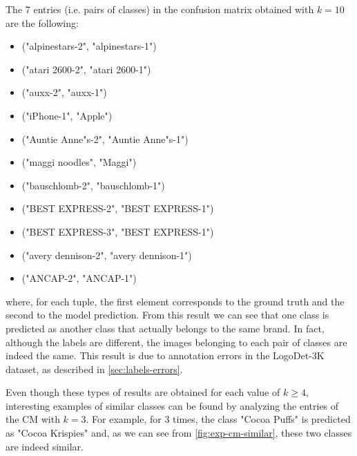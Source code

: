 The 7 entries (i.e. pairs of classes) in the confusion matrix obtained with $k=10$ are the following:
\begin{itemize}
    \item ("alpinestars-2", "alpinestars-1")
    \item ("atari 2600-2", "atari 2600-1")
    \item ("auxx-2", "auxx-1")
    \item ("iPhone-1", "Apple")
    \item ("Auntie Anne"s-2", "Auntie Anne"s-1")
    \item ("maggi noodles", "Maggi")
    \item ("bauschlomb-2", "bauschlomb-1")
    \item ("BEST EXPRESS-2", "BEST EXPRESS-1")
    \item ("BEST EXPRESS-3", "BEST EXPRESS-1")
    \item ("avery dennison-2", "avery dennison-1")
    \item ("ANCAP-2", "ANCAP-1")
\end{itemize}
where, for each tuple, the first element corresponds to the ground truth and the second to the model prediction.
From this result we can see that one class is predicted as another class that actually belongs to the same brand.
In fact, although the labels are different, the images belonging to each pair of classes are indeed the same.
This result is due to annotation errors in the LogoDet-3K dataset, as described in \autoref{sec:labels-errors}.

Even though these types of results are obtained for each value of $k \geq 4$, interesting examples of similar classes can be found by analyzing the entries of the CM with $k = 3$.
For example, for $3$ times, the class "Cocoa Puffs" is predicted as "Cocoa Krispies" and, as we can see from \autoref{fig:exp-cm-similar}, these two classes are indeed similar.

